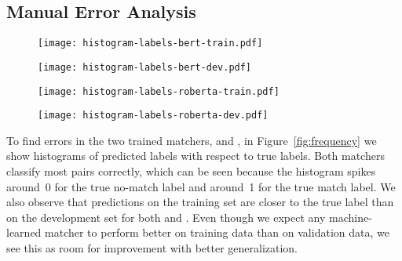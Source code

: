 \subsection{Manual Error Analysis}

\begin{figure*}
    \centering
    \begin{subfigure}{0.42\textwidth}
        \centering
        \texttt{[image: histogram-labels-bert-train.pdf]}
        \label{subfig:bert_train}
    \end{subfigure}
    \hfill
    \begin{subfigure}{0.42\textwidth}
        \centering
        \texttt{[image: histogram-labels-bert-dev.pdf]}
        \label{subfig:bert_dev}
    \end{subfigure}
    \begin{subfigure}{0.42\textwidth}
        \centering
        \texttt{[image: histogram-labels-roberta-train.pdf]}
        \label{subfig:roberta_train}
    \end{subfigure}
    \hfill
    \begin{subfigure}{0.42\textwidth}
        \centering
        \texttt{[image: histogram-labels-roberta-dev.pdf]}
        \label{subfig:roberta_dev}
    \end{subfigure}
    \caption{Histograms of predicted labels on the training and validation sets for argument key point pairs with the \BertBase and \RobertaBase classifiers. For good classifiers, predicted labels should approximately equal the true label~(0~or~1).}
    \label{fig:frequency}
\end{figure*}
To find errors in the two trained matchers, \BertBase and \RobertaBase, in Figure~\ref{fig:frequency} we show histograms of predicted labels with respect to true labels.
Both matchers classify most pairs correctly, which can be seen because the histogram spikes around~0 for the true no-match label and around~1 for the true match label.
We also observe that predictions on the training set are closer to the true label than on the development set for both \RobertaBase and \BertBase.
Even though we expect any machine-learned matcher to perform better on training data than on validation data, we see this as room for improvement with better generalization.
